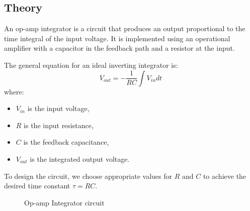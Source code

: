 \documentclass[a4paper,12pt]{article}
\begin{document}
\subsection{Theory}
An op-amp integrator is a circuit that produces an output proportional to the time integral of the input voltage. It is implemented using an operational amplifier with a capacitor in the feedback path and a resistor at the input.

The general equation for an ideal inverting integrator is:
\begin{equation}
    V_{out} = - \frac{1}{RC} \int V_{in} dt
\end{equation}
where:
\begin{itemize}
    \item \( V_{in} \) is the input voltage,
    \item \( R \) is the input resistance,
    \item \( C \) is the feedback capacitance,
    \item \( V_{out} \) is the integrated output voltage.
\end{itemize}

To design the circuit, we choose appropriate values for \( R \) and \( C \) to achieve the desired time constant \( \tau = RC \).

\begin{figure}[H]
\centering
{}
	\caption{Op-amp Integrator circuit}
\label{fig:my_label}
\end{figure}
\end{document}
